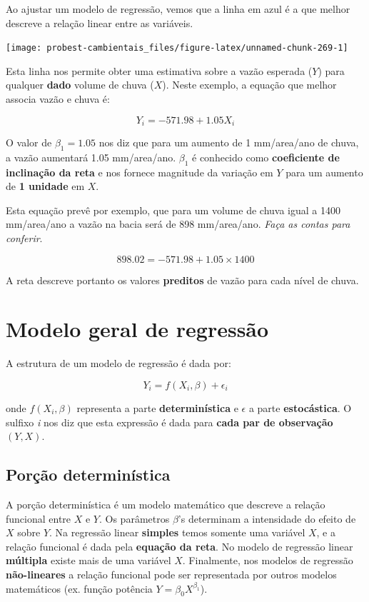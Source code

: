 \documentclass[
]{book}
\begin{document}
Ao ajustar um modelo de regressão, vemos que a linha em azul é a que melhor descreve a relação linear entre as variáveis.

\begin{center}\texttt{[image: probest-cambientais\_files/figure-latex/unnamed-chunk-269-1]} \end{center}

Esta linha nos permite obter uma estimativa sobre a vazão esperada (\(Y\)) para qualquer \textbf{dado} volume de chuva (\(X\)). Neste exemplo, a equação que melhor associa vazão e chuva é:

\[Y_i = -571.98 + 1.05 X_i\]

O valor de \(\beta_1 = 1.05\) nos diz que para um aumento de 1 mm/area/ano de chuva, a vazão aumentará 1.05 mm/area/ano. \(\beta_1\) é conhecido como \textbf{coeficiente de inclinação da reta} e nos fornece magnitude da variação em \(Y\) para um aumento de \textbf{1 unidade} em \(X\).

Esta equação prevê por exemplo, que para um volume de chuva igual a 1400 mm/area/ano a vazão na bacia será de 898 mm/area/ano. \emph{Faça as contas para conferir}.

\[898.02 = -571.98 + 1.05 \times 1400\]

A reta descreve portanto os valores \textbf{preditos} de vazão para cada nível de chuva.

\hypertarget{modelo-geral-de-regressuxe3o}{%
\section{Modelo geral de regressão}\label{modelo-geral-de-regressuxe3o}}

A estrutura de um modelo de regressão é dada por:

\[Y_i = f(X_i, \beta) + \epsilon_i\]

onde \(f(X_i, \beta)\) representa a parte \textbf{determinística} e \(\epsilon\) a parte \textbf{estocástica}. O sulfixo \emph{i} nos diz que esta expressão é dada para \textbf{cada par de observação} \((Y,X)\).

\hypertarget{poruxe7uxe3o-determinuxedstica}{%
\subsection{Porção determinística}\label{poruxe7uxe3o-determinuxedstica}}

A porção determinística é um modelo matemático que descreve a relação funcional entre \(X\) e \(Y\). Os parâmetros \(\beta\)'s determinam a intensidade do efeito de \(X\) sobre \(Y\). Na regressão linear \textbf{simples} temos somente uma variável \(X\), e a relação funcional é dada pela \textbf{equação da reta}. No modelo de regressão linear \textbf{múltipla} existe mais de uma variável \(X\). Finalmente, nos modelos de regressão \textbf{não-lineares} a relação funcional pode ser representada por outros modelos matemáticos (ex. função potência \(Y = \beta_0X^{\beta_1}\)).
\end{document}
